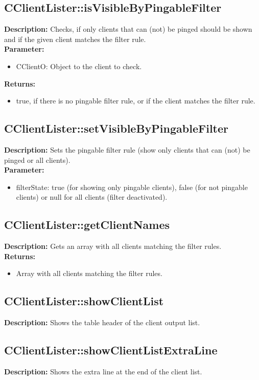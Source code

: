 \subsection{CClientLister::isVisibleByPingableFilter}
\textbf{Description:} Checks, if only clients that can (not) be pinged should be shown and if the given client matches the filter rule.\\
\textbf{Parameter:}
\begin{itemize}
\item CClientO: Object to the client to check.
\end{itemize}
\textbf{Returns:}
\begin{itemize}
\item true, if there is no pingable filter rule, or if the client matches the filter rule.
\end{itemize}

\subsection{CClientLister::setVisibleByPingableFilter}
\textbf{Description:} Sets the pingable filter rule (show only clients that can (not) be pinged or all clients).\\
\textbf{Parameter:}
\begin{itemize}
\item filterState: true (for showing only pingable clients), false (for not pingable clients) or null for all clients (filter deactivated).
\end{itemize}

\subsection{CClientLister::getClientNames}
\textbf{Description:} Gets an array with all clients matching the filter rules.\\
\textbf{Returns:}
\begin{itemize}
\item Array with all clients matching the filter rules.
\end{itemize}

\subsection{CClientLister::showClientList}
\textbf{Description:} Shows the table header of the client output list.\\

\subsection{CClientLister::showClientListExtraLine}
\textbf{Description:} Shows the extra line at the end of the client list.\\

